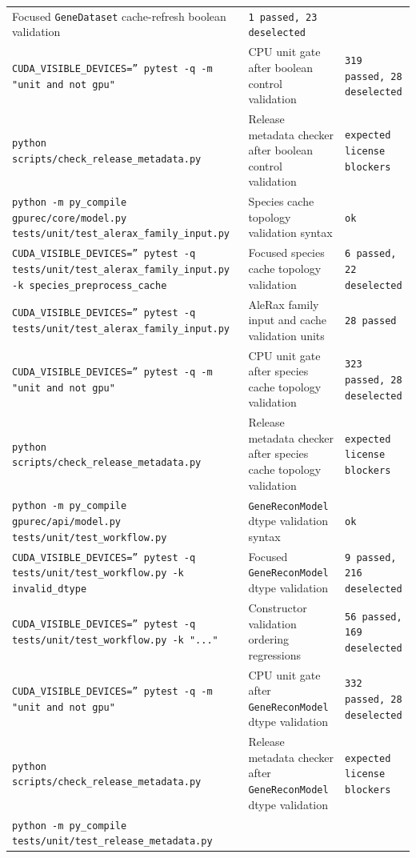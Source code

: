 \documentclass[11pt]{article}
\begin{document}
\begin{center}
\begin{tabular}{lll}
Focused \texttt{GeneDataset} cache-refresh boolean validation &
\texttt{1 passed, 23 deselected} \\
\texttt{CUDA\_VISIBLE\_DEVICES='' pytest -q -m "unit and not gpu"} &
CPU unit gate after boolean control validation &
\texttt{319 passed, 28 deselected} \\
\texttt{python scripts/check\_release\_metadata.py} &
Release metadata checker after boolean control validation &
\texttt{expected license blockers} \\
\texttt{python -m py\_compile gpurec/core/model.py tests/unit/test\_alerax\_family\_input.py} &
Species cache topology validation syntax &
\texttt{ok} \\
\texttt{CUDA\_VISIBLE\_DEVICES='' pytest -q tests/unit/test\_alerax\_family\_input.py -k species\_preprocess\_cache} &
Focused species cache topology validation &
\texttt{6 passed, 22 deselected} \\
\texttt{CUDA\_VISIBLE\_DEVICES='' pytest -q tests/unit/test\_alerax\_family\_input.py} &
AleRax family input and cache validation units &
\texttt{28 passed} \\
\texttt{CUDA\_VISIBLE\_DEVICES='' pytest -q -m "unit and not gpu"} &
CPU unit gate after species cache topology validation &
\texttt{323 passed, 28 deselected} \\
\texttt{python scripts/check\_release\_metadata.py} &
Release metadata checker after species cache topology validation &
\texttt{expected license blockers} \\
\texttt{python -m py\_compile gpurec/api/model.py tests/unit/test\_workflow.py} &
\texttt{GeneReconModel} dtype validation syntax &
\texttt{ok} \\
\texttt{CUDA\_VISIBLE\_DEVICES='' pytest -q tests/unit/test\_workflow.py -k invalid\_dtype} &
Focused \texttt{GeneReconModel} dtype validation &
\texttt{9 passed, 216 deselected} \\
\texttt{CUDA\_VISIBLE\_DEVICES='' pytest -q tests/unit/test\_workflow.py -k "..."} &
Constructor validation ordering regressions &
\texttt{56 passed, 169 deselected} \\
\texttt{CUDA\_VISIBLE\_DEVICES='' pytest -q -m "unit and not gpu"} &
CPU unit gate after \texttt{GeneReconModel} dtype validation &
\texttt{332 passed, 28 deselected} \\
\texttt{python scripts/check\_release\_metadata.py} &
Release metadata checker after \texttt{GeneReconModel} dtype validation &
\texttt{expected license blockers} \\
\texttt{python -m py\_compile tests/unit/test\_release\_metadata.py} &

\end{tabular}
\end{center}
\end{document}
